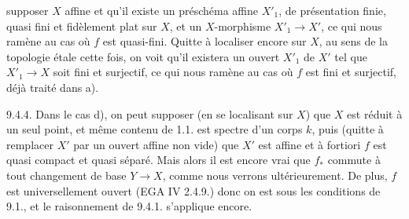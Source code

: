 
supposer $X$ affine et qu'il existe un préschéma affine $X'_1$, de présentation finie, quasi fini et fidèlement plat sur $X$, et un $X$-morphisme $X'_1\longrightarrow X'$, ce qui nous ramène au cas où $f$ est quasi-fini. Quitte à localiser encore sur $X$, au sens de la topologie étale cette fois, on voit qu'il existera un ouvert $X'_1$ de $X'$ tel que $X'_1\longrightarrow X$ soit fini et surjectif, ce qui nous ramène au cas où $f$ est fini et surjectif, déjà traité dans a).

9.4.4. Dans le cas d), on peut supposer (en se localisant sur $X$) que $X$ est réduit à un seul point, et même contenu de 1.1.  est spectre d'un corps $k$, puis (quitte à remplacer $X'$ par un ouvert affine non vide) que $X'$ est affine et à fortiori $f$ est quasi compact et quasi séparé. Mais alors il est encore vrai que $f_*$ commute à tout changement de base $Y\longrightarrow X$, comme nous verrons ultérieurement. De plus, $f$ est universellement ouvert (EGA IV 2.4.9.) donc on est sous les conditions de 9.1., et le raisonnement de 9.4.1. s'applique encore.


